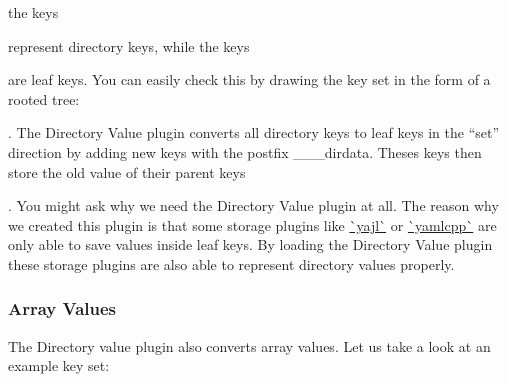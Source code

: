the keys


\begin{DoxyCode}{0}
\end{DoxyCode}


represent directory keys, while the keys


\begin{DoxyCode}{0}
\end{DoxyCode}


are leaf keys. You can easily check this by drawing the key set in the form of a rooted tree\+:


\begin{DoxyCode}{0}
\DoxyCodeLine{      /               \(\backslash\)}
\DoxyCodeLine{  /      |          /    \(\backslash\)}
\DoxyCodeLine{         |}
\end{DoxyCode}


. The Directory Value plugin converts all directory keys to leaf keys in the “set” direction by adding new keys with the postfix {\ttfamily \+\_\+\+\_\+\+\_\+dirdata}. Theses keys then store the old value of their parent keys


\begin{DoxyCode}{0}
\end{DoxyCode}


. You might ask why we need the Directory Value plugin at all. The reason why we created this plugin is that some storage plugins like \mbox{\hyperlink{autotoc_md726_src_plugins_yajl_README_md}{\`{}yajl\`{}}} or \mbox{\hyperlink{autotoc_md726_src_plugins_yajl_README_md}{\`{}yamlcpp\`{}}} are only able to save values inside leaf keys. By loading the Directory Value plugin these storage plugins are also able to represent directory values properly.\hypertarget{autotoc_md181_autotoc_md183}{}\subsubsection{Array Values}\label{autotoc_md181_autotoc_md183}
The Directory value plugin also converts array values. Let us take a look at an example key set\+:


